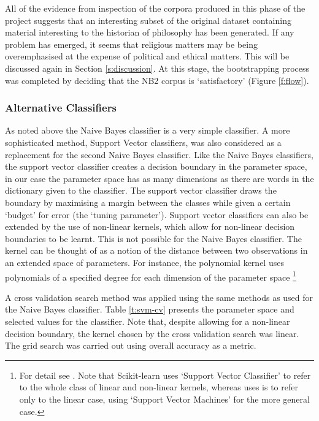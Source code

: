 \documentclass{article}
\begin{document}
All of the evidence from inspection of the corpora produced in this phase of the project suggests that an interesting subset of the original dataset containing material interesting to the historian of philosophy has been generated. If any problem has emerged, it seems that religious matters may be being overemphasised at the expense of political and ethical matters. This will be discussed again in Section \ref{s:discussion}. At this stage, the bootstrapping process was completed by deciding that the NB2 corpus is `satisfactory' (Figure \ref{f:flow}).

\subsubsection{Alternative Classifiers}\label{s:alternative-classifiers}

As noted above the Naive Bayes classifier is a very simple classifier. A more sophisticated method, Support Vector classifiers, was also considered as a replacement for the second Naive Bayes classifier. Like the Naive Bayes classifiers, the support vector classifier creates a decision boundary in the parameter space, in our case the parameter space has as many dimensions as there are words in the dictionary given to the classifier. The support vector classifier draws the boundary by maximising a margin between the classes while given a certain `budget' for error (the `tuning parameter'). Support vector classifiers can also be extended by the use of non-linear kernels, which allow for non-linear decision boundaries to be learnt. This is not possible for the Naive Bayes classifier. The kernel can be thought of as a notion of the distance between two observations in an extended space of parameters. For instance, the polynomial kernel uses polynomials of a specified degree for each dimension of the parameter space \footnote{For detail see \cite[\S\S 9.2-9.3]{islr}. Note that Scikit-learn uses `Support Vector Classifier' to refer to the whole class of linear and non-linear kernels, whereas \cite{islr} uses is to refer only to the linear case, using `Support Vector Machines' for the more general case.}

A cross validation search method was applied using the same methods as used for the Naive Bayes classifier. Table \ref{t:svm-cv} presents the parameter space and selected values for the classifier. Note that, despite allowing for a non-linear decision boundary, the kernel chosen by the cross validation search was linear. The grid search was carried out using overall accuracy as a metric.
\end{document}
